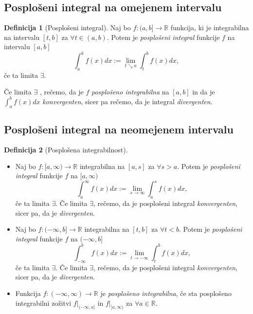 \documentclass[11pt]{article}
\theoremstyle{definition}
\newtheorem{definicija}{Definicija}[section]
\begin{document}
\subsection{Posplošeni integral na omejenem intervalu}
\vspace{0.5cm}

\begin{definicija}[Posplošeni integral]

Naj bo $f:(a, b] \rightarrow \mathbb{R}$ funkcija, ki je integrabilna na intervalu $[t, b]$ za $\forall t \in (a, b)$. Potem je \textit{posplošeni integral} funkcije $f$ na intervalu $[a, b]$
$$\int_{a}^{b} f(x) dx := \lim_{t \searrow a} \int_{t}^{b} f(x) dx,$$
če ta limita $\exists$.

Če limita $\exists$ , rečemo, da je $f$ \textit{posplošeno integrabilna} na $[a, b]$ in da je $\int_{a}^{b} f(x) dx$ \textit{konvergenten}, sicer pa rečemo, da je integral \textit{divergenten}.

\end{definicija}
\vspace{0.5cm}


\subsection{Posplošeni integral na neomejenem intervalu}
\vspace{0.5cm}

\begin{definicija}[Posplošena integrabilnost]
	\begin{itemize}
		\item Naj bo $f:[a, \infty) \rightarrow \mathbb{R}$ integrabilna na $[a, s]$ za $\forall s > a$. Potem je \textit{posplošeni integral} funkcije $f$ na $[a, \infty)$
		$$\int_{a}^{\infty} f(x) dx := \lim_{s \rightarrow \infty} \int_{a}^{s} f(x) dx,$$
		če ta limita $\exists$. Če limita $\exists$, rečemo, da je posplošeni integral \textit{konvergenten}, sicer pa, da je \textit{divergenten}. \\
		\item Naj bo $f:(-\infty, b] \rightarrow \mathbb{R}$ integrabilna na $[t, b]$ za $\forall t < b$. Potem je \textit{posplošeni integral} funkcije $f$ na $(-\infty, b]$
		$$\int_{-\infty}^{b} f(x) dx := \lim_{t \rightarrow -\infty} \int_{t}^{b} f(x) dx,$$
		če ta limita $\exists$. Če limita $\exists$, rečemo, da je posplošeni integral \textit{konvergenten}, sicer pa, da je \textit{divergenten}. \\
		\item Funkcija $f:(-\infty, \infty) \rightarrow \mathbb{R}$ je \textit{posplošeno integrabilna}, če sta posplošeno integrabilni zožitvi $f |_{(-\infty, a]}$ in $f |_{[a, \infty)}$ za $\forall a \in \mathbb{R}$. 
	\end{itemize}
\end{definicija}
\vspace{0.5cm}
\end{document}
